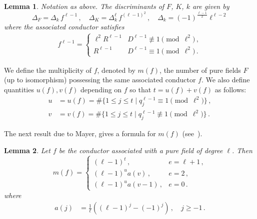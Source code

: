 \documentclass[12pt]{amsart}
\newcommand{\jd}[1]{{\color{blue}{JD: #1}} }
\newcommand{\km}[1]{{\color{magenta}{KM: #1}} }
\newtheorem{lemma}{Lemma}
\begin{document}
\begin{lemma}\label{L:1}
Notation as above.  The discriminants of $F$, $K$, $k$ are given by
$$
  \Delta_{F}=\Delta_k\, f^{\ell-1}
  \,,\quad
  \Delta_K=\Delta_k^{\ell}\, f^{(\ell-1)^2}
  \,,\quad
  \Delta_k=(-1)^{\frac{\ell-1}{2}}\ell^{\ell-2}
$$
where the associated conductor satisfies
\begin{align*}
f^{\ell-1}=\begin{cases}
\ell^2 R^{\ell-1} & D^{\ell-1}\not\equiv 1\pmod{\ell^2}\,,\\
R^{\ell-1} & D^{\ell-1}\equiv 1\pmod{\ell^2}\,.
\end{cases}
\end{align*}
\end{lemma}

We define the multiplicity of $f$, denoted by $m(f)$,
the number of pure fields $F$ (up to isomorphism)
possessing the same associated conductor $f$.
We also define quantities $u(f),v(f)$ depending on $f$
so that $t=u(f)+v(f)$ as follows:
\begin{align*}
u &= u(f)=\#\{1\leq j\leq t\mid q_j^{\ell-1}\equiv 1\pmod{\ell^2}\}\,,\\
v &= v(f)=\#\{1\leq j\leq t\mid q_j^{\ell-1}\not\equiv 1\pmod{\ell^2}\}\,.
\end{align*}

The next result due to Mayer, gives a formula for $m(f)$ (see~\cite{Mayer}).

\begin{lemma}\label{L:2}
Let $f$ be the conductor associated with a pure field of degree $\ell$.
Then
$$
m(f)=\begin{cases}
(\ell-1)^t\,, &e=\ell+1\,,\\ 
(\ell-1)^{u} a(v)\,, & e=2\,,\\
(\ell-1)^{u} a(v-1)\,, & e=0\,.
\end{cases}
$$
where
\begin{align*}
a(j)&=\frac{1}{\ell}\left((\ell-1)^j-(-1)^j\right)
\,,\quad j \geq -1\,.
\end{align*}
\end{lemma}

\end{document}
